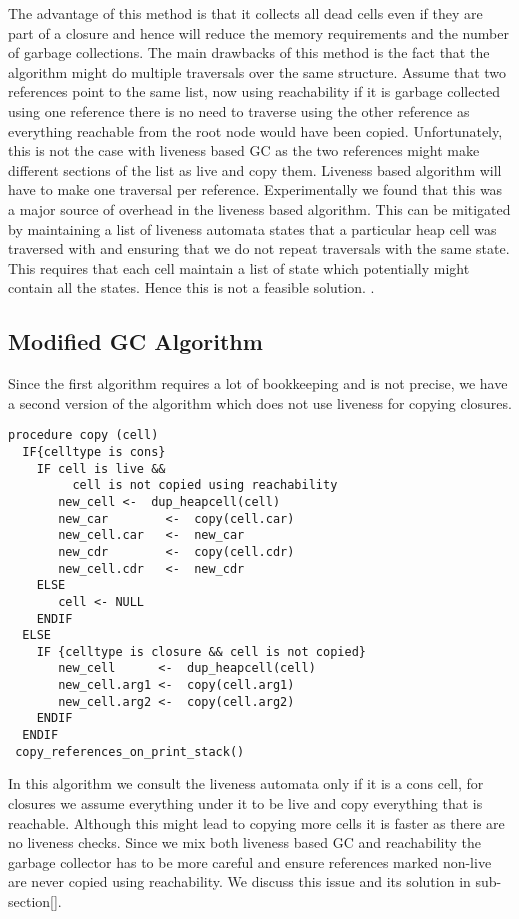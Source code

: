 \documentclass[9pt]{sigplanconf}
\newcommand{\comment}[1]{{\color{Myblue}{(#1)}}}
\newcommand{\cred}[1]{{\color{red}{#1}}}
\begin{document}
The advantage of  this method is that it collects  all dead cells even
if  they are  part  of a  closure  and hence  will  reduce the  memory
requirements and the number of garbage collections. The main drawbacks
of  this method  is  the fact  that  the algorithm  might do  multiple
traversals over  the same structure. Assume that  two references point
to the  same list, now using  reachability if it  is garbage collected
using  one reference  there is  no need  to traverse  using  the other
reference as everything  reachable from the root node  would have been
copied.  Unfortunately, this is not the case with liveness based GC as
the two references  might make different sections of  the list as live
and  copy  them.  Liveness  based  algorithm will  have  to  make  one
traversal  per reference.   Experimentally we  found that  this  was a
major source of overhead in the liveness based algorithm.  This can be
mitigated by  maintaining a  list of liveness  automata states  that a
particular heap  cell was traversed with  and ensuring that  we do not
repeat traversals  with the same  state. This requires that  each cell
maintain  a list  of state  which  potentially might  contain all  the
states.  Hence  this  is  not  a  feasible  solution.   \cred{repeated
  traversals if sharing}.


\subsection{Modified GC Algorithm}
Since the first algorithm requires a lot of bookkeeping and is not
precise, we have a second version of the algorithm 
which does not use liveness for copying closures. 
\begin{verbatim}
procedure copy (cell)
  IF{celltype is cons}
    IF cell is live &&
         cell is not copied using reachability
       new_cell <-  dup_heapcell(cell) 
       new_car        <-  copy(cell.car)
       new_cell.car   <-  new_car
       new_cdr        <-  copy(cell.cdr)
       new_cell.cdr   <-  new_cdr
    ELSE
       cell <- NULL
    ENDIF
  ELSE
    IF {celltype is closure && cell is not copied}
       new_cell      <-  dup_heapcell(cell)
       new_cell.arg1 <-  copy(cell.arg1)
       new_cell.arg2 <-  copy(cell.arg2)
    ENDIF
  ENDIF
 copy_references_on_print_stack()
\end{verbatim}

In this  algorithm we consult  the liveness automata  only if it  is a
cons cell, for  closures we assume everything under it  to be live and
copy everything that is reachable. Although this might lead to copying
more  cells   it  is   faster  as  there   are  no   liveness  checks.
\comment{Once  experimental  results  are  obtained  compare  the  two
  algorithms  here}   Since  we  mix   both  liveness  based   GC  and
reachability the garbage  collector has to be more  careful and ensure
references  marked non-live  are never  copied using  reachability. We
discuss this issue and its solution in sub-section[]\cred{hanging like
  a sore thumb}.
\end{document}
